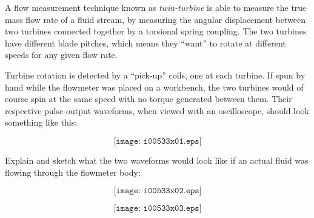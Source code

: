 

A flow measurement technique known as {\it twin-turbine} is able to measure the true mass flow rate of a fluid stream, by measuring the angular displacement between two turbines connected together by a torsional spring coupling.  The two turbines have different blade pitches, which means they ``want'' to rotate at different speeds for any given flow rate.

Turbine rotation is detected by a ``pick-up'' coils, one at each turbine.  If spun by hand while the flowmeter was placed on a workbench, the two turbines would of course spin at the same speed with no torque generated between them.  Their respective pulse output waveforms, when viewed with an oscilloscope, should look something like this:

$$\texttt{[image: i00533x01.eps]}$$

\filbreak

Explain and sketch what the two waveforms would look like if an actual fluid was flowing through the flowmeter body:

$$\texttt{[image: i00533x02.eps]}$$







$$\texttt{[image: i00533x03.eps]}$$











